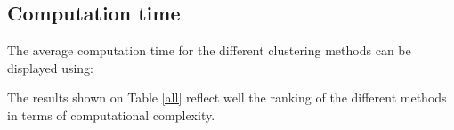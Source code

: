 \documentclass[12pt,a4paper,fleqn]{tufte-handout}
\begin{document}
\subsection{Computation time}

The average computation time for the different clustering methods can be displayed using:

The results shown on Table \ref{all} reflect well the ranking of the different methods in terms of computational complexity.


  
  
 
 
  
\end{document}
